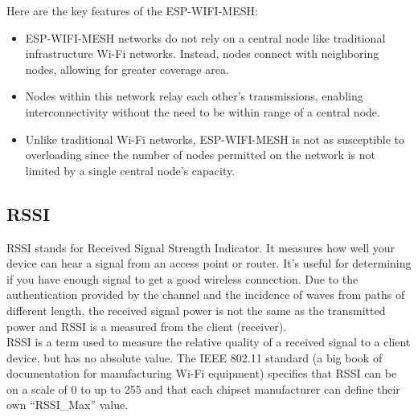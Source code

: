 Here are the key features of the ESP-WIFI-MESH:
\begin{itemize}
    \item ESP-WIFI-MESH networks do not rely on a central node like traditional infrastructure Wi-Fi networks. Instead, nodes connect with neighboring nodes, allowing for greater coverage area.
    \item Nodes within this network relay each other's transmissions, enabling interconnectivity without the need to be within range of a central node.
    \item Unlike traditional Wi-Fi networks, ESP-WIFI-MESH is not as susceptible to overloading since the number of nodes permitted on the network is not limited by a single central node's capacity.
\end{itemize}

\subsection{RSSI}
RSSI stands for Received Signal Strength Indicator. It measures how well your device can hear a signal from an access point or router. It’s useful for determining if you have enough signal to get a good wireless connection. Due to the authentication provided by the channel and the incidence of waves from paths of different length, the received signal power is not the same as the transmitted power and RSSI is a measured from the client (receiver).{\tiny \textcolor{white}{\ac{RSSI}}}{\tiny \textcolor{white}{\ac{IEEE}}}\\
RSSI is a term used to measure the relative quality of a received signal to a client device, but has no absolute value. The IEEE 802.11 standard (a big book of documentation for manufacturing Wi-Fi equipment) specifies that RSSI can be on a scale of 0 to up to 255 and that each chipset manufacturer can define their own “RSSI\_Max” value.  \\
